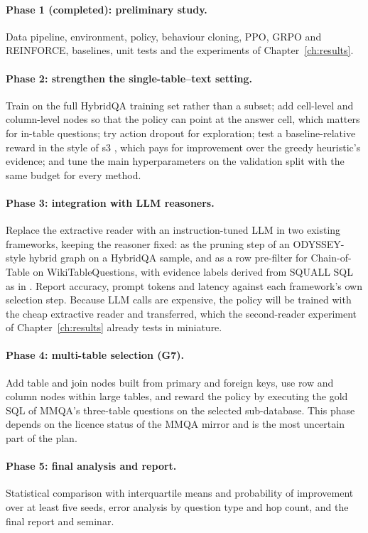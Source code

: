 \paragraph{Phase 1 (completed): preliminary study.} Data pipeline, environment, policy, behaviour cloning, PPO, GRPO and REINFORCE, baselines, unit tests and the experiments of Chapter~\ref{ch:results}.

\paragraph{Phase 2: strengthen the single-table--text setting.} Train on the full HybridQA training set rather than a subset; add cell-level and column-level nodes so that the policy can point at the answer cell, which matters for in-table questions; try action dropout \citep{lin2018multihop} for exploration; test a baseline-relative reward in the style of s3 \citep{jiang2025s3}, which pays for improvement over the greedy heuristic's evidence; and tune the main hyperparameters on the validation split with the same budget for every method.

\paragraph{Phase 3: integration with LLM reasoners.} Replace the extractive reader with an instruction-tuned LLM in two existing frameworks, keeping the reasoner fixed: as the pruning step of an ODYSSEY-style hybrid graph on a HybridQA sample, and as a row pre-filter for Chain-of-Table on WikiTableQuestions, with evidence labels derived from SQUALL SQL as in \citet{lee2024learningtoreduce}. Report accuracy, prompt tokens and latency against each framework's own selection step. Because LLM calls are expensive, the policy will be trained with the cheap extractive reader and transferred, which the second-reader experiment of Chapter~\ref{ch:results} already tests in miniature.

\paragraph{Phase 4: multi-table selection (G7).} Add table and join nodes built from primary and foreign keys, use row and column nodes within large tables, and reward the policy by executing the gold SQL of MMQA's three-table questions on the selected sub-database. This phase depends on the licence status of the MMQA mirror and is the most uncertain part of the plan.

\paragraph{Phase 5: final analysis and report.} Statistical comparison with interquartile means and probability of improvement over at least five seeds, error analysis by question type and hop count, and the final report and seminar.
